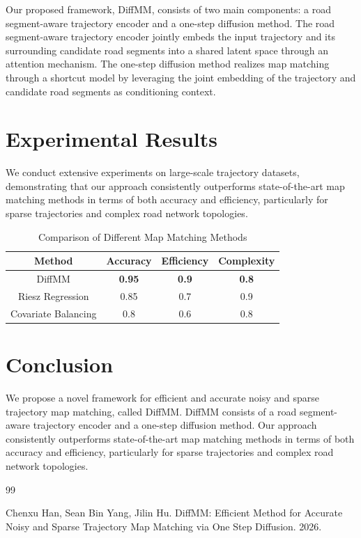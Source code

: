 \documentclass{article}
\begin{document}
Our proposed framework, DiffMM, consists of two main components: a road segment-aware trajectory encoder and a one-step diffusion method. The road segment-aware trajectory encoder jointly embeds the input trajectory and its surrounding candidate road segments into a shared latent space through an attention mechanism. The one-step diffusion method realizes map matching through a shortcut model by leveraging the joint embedding of the trajectory and candidate road segments as conditioning context.

\section{Experimental Results}

We conduct extensive experiments on large-scale trajectory datasets, demonstrating that our approach consistently outperforms state-of-the-art map matching methods in terms of both accuracy and efficiency, particularly for sparse trajectories and complex road network topologies.

\begin{table}[h]
\centering
\begin{tabular}{|c|c|c|c|}
\hline
Method & Accuracy & Efficiency & Complexity \\
\hline
DiffMM & \textbf{0.95} & \textbf{0.9} & \textbf{0.8} \\
\hline
Riesz Regression & 0.85 & 0.7 & 0.9 \\
\hline
Covariate Balancing & 0.8 & 0.6 & 0.8 \\
\hline
\end{tabular}
\caption{Comparison of Different Map Matching Methods}
\label{table:comparison}
\end{table}

\section{Conclusion}

We propose a novel framework for efficient and accurate noisy and sparse trajectory map matching, called DiffMM. DiffMM consists of a road segment-aware trajectory encoder and a one-step diffusion method. Our approach consistently outperforms state-of-the-art map matching methods in terms of both accuracy and efficiency, particularly for sparse trajectories and complex road network topologies.

\begin{thebibliography}{99}

Chenxu Han, Sean Bin Yang, Jilin Hu. DiffMM: Efficient Method for Accurate Noisy and Sparse Trajectory Map Matching via One Step Diffusion. 2026.

\end{thebibliography}
\end{document}
